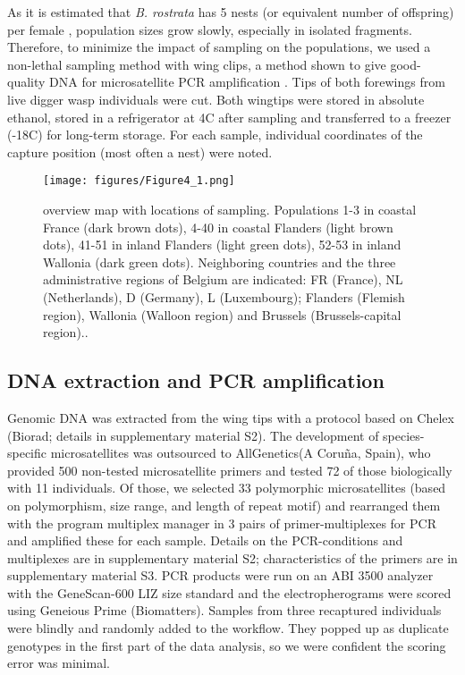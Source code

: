 \documentclass[10pt, twoside]{book} %
\begin{document}
	As it is estimated that \textit{B. rostrata} has 5 nests (or equivalent number of offspring) per female \citep{larsson1989}, population sizes grow slowly, especially in isolated fragments. Therefore, to minimize the impact of sampling on the populations, we used a non-lethal sampling method with wing clips, a method shown to give good-quality DNA for microsatellite PCR amplification \citep{chaline2004}. Tips of both forewings from live digger wasp individuals were cut. Both wingtips were stored in absolute ethanol, stored in a refrigerator at 4\textdegree C after sampling and transferred to a freezer (-18\textdegree C) for long-term storage. For each sample, individual coordinates of the capture position (most often a nest) were noted.\\
	
	\begin{figure}[h!]
		\begin{center}
			\texttt{[image: figures/Figure4\_1.png]}
		\end{center}
		\begin{footnotesize}
			\caption{overview map with locations of sampling. Populations 1-3 in coastal France (dark brown dots), 4-40 in coastal Flanders (light brown dots), 41-51 in inland Flanders (light green dots), 52-53 in inland Wallonia (dark green dots). Neighboring countries and the three administrative regions of Belgium are indicated: FR (France), NL (Netherlands), D (Germany), L (Luxembourg); Flanders (Flemish region), Wallonia (Walloon region) and Brussels (Brussels-capital region).. \label{fig4.1}}
		\end{footnotesize}
	\end{figure}

	\subsection{DNA extraction and PCR amplification}
	Genomic DNA was extracted from the wing tips with a protocol based on Chelex (Biorad; details in supplementary material S2). The development of species-specific microsatellites was outsourced to AllGenetics\textregistered  (A Coru\~{n}a, Spain), who provided 500 non-tested microsatellite primers and tested 72 of those biologically with 11 individuals. Of those, we selected 33 polymorphic microsatellites (based on polymorphism, size range, and length of repeat motif) and rearranged them with the program multiplex manager \citep{holleley2009} in 3 pairs of primer-multiplexes for PCR and amplified these for each sample. Details on the PCR-conditions and multiplexes are in supplementary material S2; characteristics of the primers are in supplementary material S3. PCR products were run on an ABI 3500 analyzer with the GeneScan-600 LIZ size standard and the electropherograms were scored using Geneious Prime (Biomatters). Samples from three recaptured individuals were blindly and randomly added to the workflow. They popped up as duplicate genotypes in the first part of the data analysis, so we were confident the scoring error was minimal.\\
	
\end{document}
